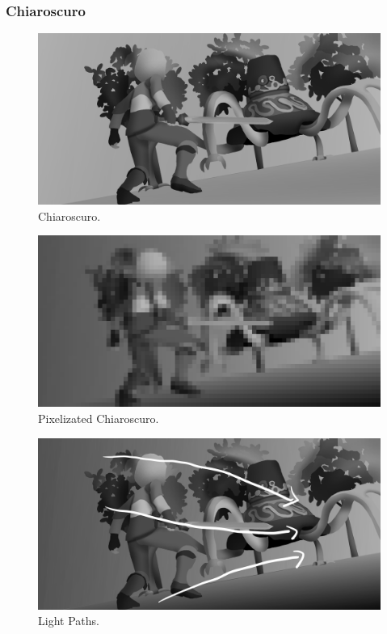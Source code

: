 \documentclass{cup-pan}
\begin{document}
        \subsubsection{Chiaroscuro}

            \begin{figure}[H]
                \includegraphics[width=\textwidth]{Imagenes/Fanart2/Analysis/claroscuro.png}
                \caption{Chiaroscuro.}
            \end{figure}

            \begin{figure}[H]
                \includegraphics[width=\textwidth]{Imagenes/Fanart2/Analysis/pixel.png}
                \caption{Pixelizated Chiaroscuro.}
            \end{figure}

            \begin{figure}[H]
                \includegraphics[width=\textwidth]{Imagenes/Fanart2/Analysis/recorrido luz.png}
                \caption{Light Paths.}
            \end{figure}
\end{document}
